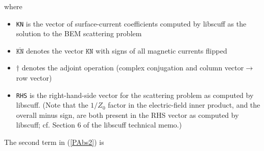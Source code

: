 \documentclass[letterpaper]{article}
\begin{document}
where
\begin{itemize} 
  \item \texttt{KN} is the vector of surface-current coefficients 
        computed by {\sc libscuff} as the solution to the BEM scattering
        problem
  \item $\overline{\texttt{KN}}$ denotes the vector $\texttt{KN}$ with
        signs of all magnetic currents flipped 
  \item $\dagger$ denotes the adjoint operation (complex conjugation
        and column vector$\to$row vector)
  \item \texttt{RHS} is the right-hand-side vector for the scattering 
        problem as computed by {\sc libscuff}. (Note that 
        the $1/Z_0$ factor in the electric-field inner product,
        and the overall minus sign, are both present in the RHS 
        vector as computed by {\sc libscuff};
        cf. Section 6 of the {\sc libscuff} technical memo.)
\end{itemize} 
The second term in (\ref{PAbs2}) is 
\end{document}
